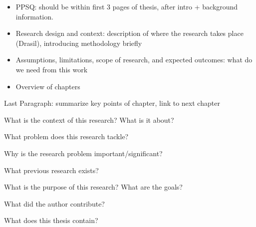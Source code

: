 \begin{writingdirectives}
\begin{itemize}
            \item PPSQ: should be within first 3 pages of thesis, after intro +
                  background information.

            \item Research design and context: description of where the research
                  takes place (Drasil), introducing methodology briefly

            \item Assumptions, limitations, scope of research, and expected
                  outcomes: what do we need from this work

            \item Overview of chapters

      \end{itemize}

      \item Last Paragraph: summarize key points of chapter, link to next
      chapter

      \item What is the context of this research? What is it about?

      \item What problem does this research tackle?

      \item Why is the research problem important/significant?

      \item What previous research exists?

      \item What is the purpose of this research? What are the goals?

      \item What did the author contribute?

      \item What does this thesis contain? 

\end{writingdirectives}

